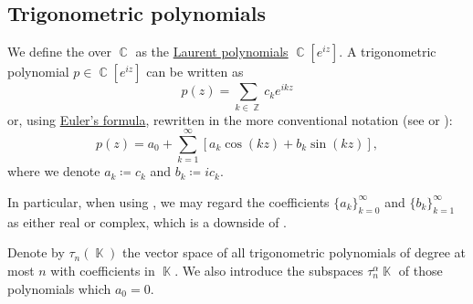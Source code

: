 \subsection{Trigonometric polynomials}\label{subsec:trigonometric_polynomials}

\begin{definition}\label{def:trigonometric_polynomial}
  We define the  over \( \BbbC \) as the \hyperref[def:laurent_polynomial/polynomial]{Laurent polynomials} \( \BbbC[e^{iz}] \). A trigonometric polynomial \( p \in \BbbC[e^{iz}] \) can be written as
  \begin{equation}\label{def:trigonometric_polynomial/exponential}
    p(z) = \sum_{k \in \BbbZ} c_k e^{ikz}
  \end{equation}
  or, using \hyperref[thm:exponential_trigonometric_identities/eulers_formula]{Euler's formula}, rewritten in the more conventional notation (see \cite[1]{Боянов2008} or \cite[88]{Rudin1987RealAndComplex}):
  \begin{equation}\label{def:trigonometric_polynomial/trigonometric}
    p(z) = a_0 + \sum_{k=1}^\infty [ a_k \cos(kz) + b_k \sin(kz) ],
  \end{equation}
  where we denote \( a_k \coloneqq c_k \) and \( b_k \coloneqq ic_k \).

  In particular, when using , we may regard the coefficients \( \{ a_k \}_{k=0}^\infty \) and \( \{ b_k \}_{k=1}^\infty \) as either real or complex, which is a downside of .

  Denote by \( \tau_n(\BbbK) \) the vector space of all trigonometric polynomials of degree at most \( n \) with coefficients in \( \BbbK \). We also introduce the subspaces \( \tau_n^\alpha{\BbbK} \) of those polynomials which \( a_0 = 0 \).
\end{definition}
